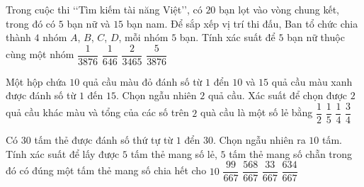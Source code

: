 \begin{ex}%
Trong cuộc thi \lq\lq  Tìm kiếm tài năng Việt\rq\rq, có $20$ bạn lọt vào vòng chung kết, trong đó có $5$ bạn nữ và $15$ bạn nam. Để sắp xếp vị trí thi đấu, Ban tổ chức chia thành $4$ nhóm $A$, $B$, $C$, $D$, mỗi nhóm $5$ bạn. Tính xác suất để $5$ bạn nữ thuộc cùng một nhóm
\choice
{$\dfrac{1}{3876}$}
{\True $\dfrac{1}{646}$}
{$\dfrac{2}{3465}$}
{$\dfrac{5}{3876}$}
\end{ex}

\begin{ex}%
Một hộp chứa $10$ quả cầu màu đỏ đánh số từ $1$ đển $10$ và $15$ quả cầu màu xanh được đánh số từ $1$ đến $15$. Chọn ngẫu nhiên $2$ quả cầu. Xác suất để chọn được $2$ quả cầu khác màu và tổng của các số trên $2$ quà cầu là một số lẻ bằng
\choice
{$\dfrac{1}{2}$}
{$\dfrac{1}{5}$}
{\True $\dfrac{1}{4}$}
{$\dfrac{3}{4}$}
\end{ex}

\begin{ex}%
Có $30$ tấm thẻ được đánh số thứ tự từ $1$ đển $30$. Chọn ngẫu nhiên ra $10$ tấm. Tính xác suất để lấy được $5$ tấm thẻ mang số lẻ, $5$ tấm thẻ mang số chẵn trong đó có đúng một tấm thẻ mang số chia hết cho $10$
\choice
{\True $\dfrac{99}{667}$}
{$\dfrac{568}{667}$}
{$\dfrac{33}{667}$}
{$\dfrac{634}{667}$}
\end{ex}

